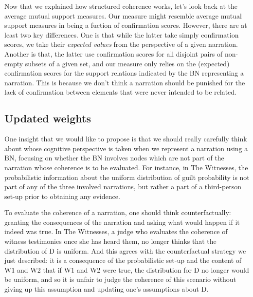 \documentclass[10pt,]{scrartcl}
\begin{document}
Now that we explained how structured coherence works, let's look back at the average mutual support measures.  Our measure might resemble average mutual support measures in being a fuction of confirmation scores. However, there are at least two key differences.
One is that while the latter  take simply confirmation scores, we take their \emph{expected values} from the perspective of a given narration. Another is that, the latter use confirmation scores for all disjoint pairs of non-empty subsets of a given set, and our measure only relies on the
(expected) confirmation scores for the support relations indicated by the BN
representing a narration. This is because we don't think a narration
should be punished for the lack of confirmation between elements that
were never intended to be related. 







\subsection{Updated weights}


One insight that we would like to propose is that we should really carefully think about whose cognitive perspective is taken when we represent a narration using a BN, focusing on whether the BN involves nodes which are not part of the narration whose coherence is to be
evaluated. For instance, in \textsf{The Witnesses}, the probabilistic information about the
uniform distribution of guilt probability is not part of any of the three involved narrations, but rather a part of a third-person set-up prior to obtaining any evidence.

To evaluate the coherence of a narration,  one should think counterfactually: granting the consequences of the
narration and asking what would happen if it indeed was true. 
In \textsf{The Witnesses}, a judge who evaluates the coherence of witness testimonies once she has heard them, no longer thinks that the distribution of \textsf{D} is uniform. And this agrees with the counterfactual strategy we just
described: it is a consequence of the probabilistic set-up and the content of \textsf{W1} and \textsf{W2} that if \textsf{W1} and
\textsf{W2} were true, the distribution for \textsf{D} no longer would
be uniform, and so it is unfair to judge the coherence of this scenario
without giving up this assumption and updating one's assumptions about
\textsf{D}.
\end{document}
